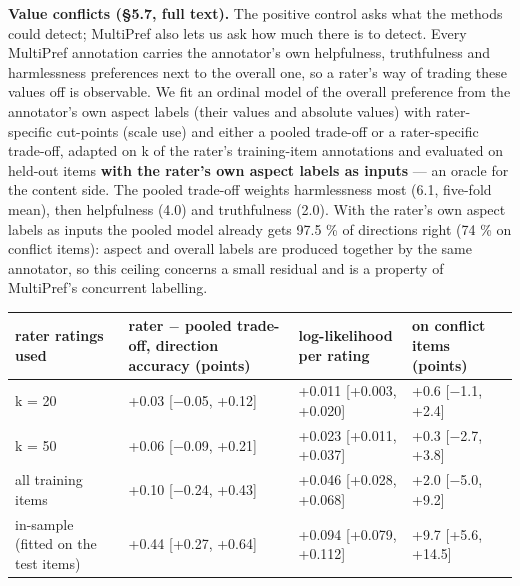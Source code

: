 \documentclass{article}
\begin{document}
\textbf{Value conflicts (\S{}5.7, full text).} The positive control asks what the methods could detect; MultiPref also lets us ask how much there is to detect. Every MultiPref annotation carries the annotator's own helpfulness, truthfulness and harmlessness preferences next to the overall one, so a rater's way of trading these values off is observable. We fit an ordinal model of the overall preference from the annotator's own aspect labels (their values and absolute values) with rater-specific cut-points (scale use) and either a pooled trade-off or a rater-specific trade-off, adapted on k of the rater's training-item annotations and evaluated on held-out items \textbf{with the rater's own aspect labels as inputs} --- an oracle for the content side. The pooled trade-off weights harmlessness most (6.1, five-fold mean), then helpfulness (4.0) and truthfulness (2.0). With the rater's own aspect labels as inputs the pooled model already gets 97.5 \% of directions right (74 \% on conflict items): aspect and overall labels are produced together by the same annotator, so this ceiling concerns a small residual and is a property of MultiPref's concurrent labelling.

{\def\LTcaptype{none} %
\begin{table}[t]\centering\footnotesize\begin{tabular}{@{}
  l
  l
  l
  l@{}}
\toprule\noalign{}
rater ratings used & rater $-$ pooled trade-off, direction accuracy (points) & log-likelihood per rating & on conflict items (points) \\
\midrule\noalign{}



k = 20 & +0.03 {[}$-$0.05, +0.12{]} & +0.011 {[}+0.003, +0.020{]} & +0.6 {[}$-$1.1, +2.4{]} \\
k = 50 & +0.06 {[}$-$0.09, +0.21{]} & +0.023 {[}+0.011, +0.037{]} & +0.3 {[}$-$2.7, +3.8{]} \\
all training items & +0.10 {[}$-$0.24, +0.43{]} & +0.046 {[}+0.028, +0.068{]} & +2.0 {[}$-$5.0, +9.2{]} \\
in-sample (fitted on the test items) & +0.44 {[}+0.27, +0.64{]} & +0.094 {[}+0.079, +0.112{]} & +9.7 {[}+5.6, +14.5{]} \\
\bottomrule
\end{tabular}\end{table}
}
\end{document}
